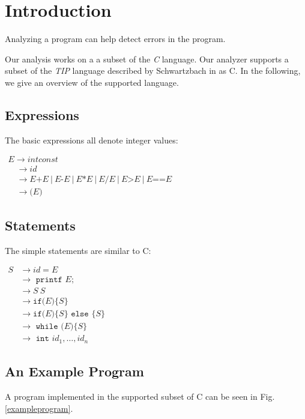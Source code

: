 \section{Introduction}

Analyzing a program can help detect errors in the program. 

\newpar Our analysis works on a a subset of the \textit{C} language. Our analyzer supports a subset of the \textit{TIP} language described by Schwartzbach in \cite{spa} as C. In the following, we give an overview of the supported language.

\subsection{Expressions}
The basic expressions all denote integer values:
\begin{center}
    $\begin{array}{l}{E \rightarrow { intconst }} \\ {\quad \rightarrow { id }} \\ {\quad \rightarrow E\texttt{+}E\:|\:E\texttt{-}E\:|\:E \texttt{*} E\:|\:E \texttt{/} E\:|\:E\texttt{>}E\:|\:E\texttt{==}E} \\ \quad \rightarrow\texttt{(}E\texttt{)}\end{array}$    
\end{center}

\subsection{Statements}
The simple statements are similar to C:
\begin{center}
    $\begin{aligned} S & \rightarrow i d=E \\ & \rightarrow \texttt { printf } E ; \\ & \rightarrow S\:S \\ & \rightarrow \texttt{if(}E\texttt{)}\{S\} \\ & \rightarrow \texttt{if(} E \texttt{)}\{S\} \texttt { else }\{S\} \\ & \rightarrow \texttt { while (}E\texttt{)}\{S\} \\ & \rightarrow \texttt { int } i d_{1}, \ldots, i d_{n} \end{aligned}$
\end{center}

\subsection{An Example Program}
A program implemented in the supported subset of C can be seen in Fig. \ref{exampleprogram}.

